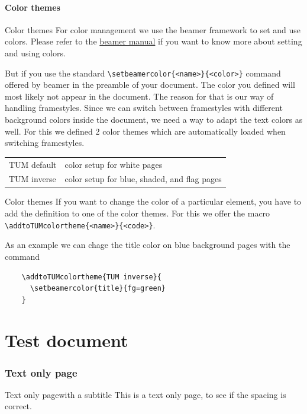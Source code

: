 \subsection{Color themes}
\begin{frame}[fragile]{Color themes}
  For color management we use the beamer framework to set and use colors.
  Please refer to the \href{https://ctan.org/pkg/beamer}{beamer manual}
  if you want to know more about setting and using colors.

  But if you use the standard \lstinline|\setbeamercolor{<name>}{<color>}|
  command offered by beamer in the preamble of your document. The color
  you defined will most likely not appear in the document. The reason for
  that is our way of handling framestyles. Since we can switch between
  framestyles with different background colors inside the document, we need
  a way to adapt the text colors as well. For this we defined 2 color themes
  which are automatically loaded when switching framestyles.

  \vspace{3mm}
  \begin{tabular}{ll}
    TUM default & color setup for white pages                  \\
    TUM inverse & color setup for blue, shaded, and flag pages \\
  \end{tabular}
\end{frame}

\begin{frame}[fragile]{Color themes}
  If you want to change the color of a particular element, you have to add
  the definition to one of the color themes. For this we offer the macro
  \lstinline|\addtoTUMcolortheme{<name>}{<code>}|.

  \vspace{3mm}
  As an example we can chage the title color on blue background pages with the
  command
  \begin{lstlisting}
    \addtoTUMcolortheme{TUM inverse}{
      \setbeamercolor{title}{fg=green}
    }
  \end{lstlisting}
\end{frame}


\part{Test document}
\section{Text only page}
\begin{frame}{Text only page}{with a subtitle}
  This is a text only page, to see if the spacing is correct.
  \lipsum[1]
\end{frame}

